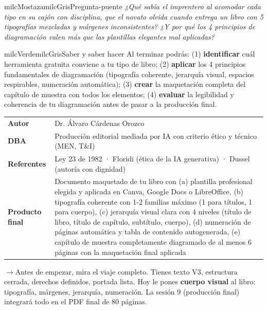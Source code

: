 \documentclass[11pt,letterpaper]{article}
\newcommand{\puente}[1]{%
  \begin{puentebox}%
    \textcolor{milcGradeDark}{$\rightarrow$}\hspace{2mm}#1%
  \end{puentebox}%
}
\begin{document}
\begin{softbox}{milcMostaza}{milcGris}{Pregunta-puente}
\textit{¿Qué sabía el imprentero al acomodar cada tipo en su cajón con disciplina, que el novato olvida cuando entrega un libro con 5 tipografías mezcladas y márgenes inconsistentes? ¿Y por qué los 4 principios de diagramación valen más que las plantillas elegantes mal aplicadas?}
\end{softbox}

\begin{softbox}{milcVerde}{milcGris}{Saber y saber hacer}
Al terminar podrás: (1) \textbf{identificar} cuál herramienta gratuita conviene a tu tipo de libro; (2) \textbf{aplicar} los 4 principios fundamentales de diagramación (tipografía coherente, jerarquía visual, espacios respirables, numeración automática); (3) \textbf{crear} la maquetación completa del capítulo de muestra con todos los elementos; (4) \textbf{evaluar} la legibilidad y coherencia de tu diagramación antes de pasar a la producción final.
\end{softbox}



\small
\begin{tabularx}{\textwidth}{>{\bfseries}p{3.0cm}Y}
Autor & Dr. Álvaro Cárdenas Orozco\\
DBA & Producción editorial mediada por IA con criterio ético y técnico (MEN, T\&I)\\
Referentes & Ley 23 de 1982 · Floridi (ética de la IA generativa) · Dussel (autoría con dignidad)\\
Producto final & Documento maquetado de tu libro con (a) plantilla profesional elegida y aplicada en Canva, Google Docs o LibreOffice, (b) tipografía coherente con 1-2 familias máximo (1 para títulos, 1 para cuerpo), (c) jerarquía visual clara con 4 niveles (título de libro, título de capítulo, subtítulo, cuerpo), (d) numeración de páginas automática y tabla de contenido autogenerada, (e) capítulo de muestra completamente diagramado de al menos 6 páginas con la maquetación final aplicada\\
\end{tabularx}
\normalsize

\puente{Antes de empezar, mira el viaje completo. Tienes texto V3, estructura cerrada, derechos definidos, portada lista. Hoy le pones \textbf{cuerpo visual} al libro: tipografía, márgenes, jerarquía, numeración. La sesión 9 (producción final) integrará todo en el PDF final de 80 páginas.}
\end{document}
